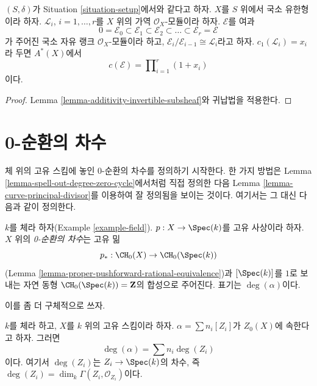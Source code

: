 \begin{lemma}
\label{lemma-chern-filter-by-linebundles}
$(S, \delta)$가 Situation \ref{situation-setup}에서와 같다고 하자.
$X$를 $S$ 위에서 국소 유한형이라 하자.
${\mathcal L}_i$, $i = 1, \ldots, r$를 $X$ 위의 가역
$\mathcal{O}_X$-모듈이라 하자. $\mathcal{E}$를 여과
$$
0 = \mathcal{E}_0 \subset \mathcal{E}_1 \subset \mathcal{E}_2
\subset \ldots \subset \mathcal{E}_r = \mathcal{E}
$$
가 주어진 국소 자유 랭크 $\mathcal{O}_X$-모듈이라 하고,
$\mathcal{E}_i/\mathcal{E}_{i - 1} \cong \mathcal{L}_i$라고 하자.
$c_1({\mathcal L}_i) = x_i$라 두면 $A^*(X)$에서
$$
c(\mathcal{E})
=
\prod\nolimits_{i = 1}^r (1 + x_i)
$$
이다.
\end{lemma}

\begin{proof}
Lemma \ref{lemma-additivity-invertible-subsheaf}와 귀납법을 적용한다.
\end{proof}




\section{0-순환의 차수}
\label{section-degree-zero-cycles}

\noindent
체 위의 고유 스킴에 놓인 0-순환의 차수를 정의하기 시작한다. 한 가지
방법은 Lemma \ref{lemma-spell-out-degree-zero-cycle}에서처럼 직접
정의한 다음 Lemma \ref{lemma-curve-principal-divisor}를 이용하여
잘 정의됨을 보이는 것이다. 여기서는 그 대신 다음과 같이 정의한다.

\begin{definition}
\label{definition-degree-zero-cycle}
$k$를 체라 하자(Example \ref{example-field}). $p : X \to \Spec(k)$를
고유 사상이라 하자. $X$ 위의 {\it 0-순환의 차수}는 고유 밂
$$
p_* : \CH_0(X) \to \CH_0(\Spec(k))
$$
(Lemma \ref{lemma-proper-pushforward-rational-equivalence})과
$[\Spec(k)]$를 $1$로 보내는 자연 동형
$\CH_0(\Spec(k)) = \mathbf{Z}$의 합성으로 주어진다. 표기는
$\deg(\alpha)$이다.
\end{definition}

\noindent
이를 좀 더 구체적으로 쓰자.

\begin{lemma}
\label{lemma-spell-out-degree-zero-cycle}
$k$를 체라 하고, $X$를 $k$ 위의 고유 스킴이라 하자.
$\alpha = \sum n_i[Z_i]$가 $Z_0(X)$에 속한다고 하자. 그러면
$$
\deg(\alpha) = \sum n_i\deg(Z_i)
$$
이다. 여기서 $\deg(Z_i)$는 $Z_i \to \Spec(k)$의 차수, 즉
$\deg(Z_i) = \dim_k \Gamma(Z_i, \mathcal{O}_{Z_i})$이다.
\end{lemma}

